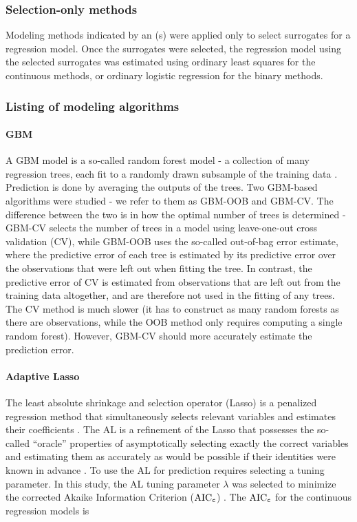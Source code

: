 \documentclass[authoryear,review, 12pt]{elsarticle}
\begin{document}
\subsubsection{Selection-only methods}\label{selection-only-methods}

Modeling methods indicated by an (s) were applied only to select
surrogates for a regression model. Once the surrogates were selected,
the regression model using the selected surrogates was estimated using
ordinary least squares for the continuous methods, or ordinary logistic
regression for the binary methods.

\subsubsection{Listing of modeling
algorithms}\label{listing-of-modeling-algorithms}

\paragraph{GBM}\label{gbm}

A GBM model is a so-called random forest model - a collection of many
regression trees, each fit to a randomly drawn subsample of the training
data \citep{Friedman-2001}. Prediction is done by averaging the outputs
of the trees. Two GBM-based algorithms were studied - we refer to them
as GBM-OOB and GBM-CV. The difference between the two is in
how the optimal number of trees is determined - GBM-CV selects the
number of trees in a model using leave-one-out cross validation (CV),
while GBM-OOB uses the so-called out-of-bag error estimate, where the
predictive error of each tree is estimated by its predictive error over
the observations that were left out when fitting the tree. In contrast,
the predictive error of CV is estimated from observations that are left
out from the training data altogether, and are therefore not used in the
fitting of any trees. The CV method is much slower (it has to construct
as many random forests as there are observations, while the OOB method
only requires computing a single random forest). However, GBM-CV should
more accurately estimate the prediction error.

\paragraph{Adaptive Lasso}\label{adaptive-lasso}

The least absolute shrinkage and selection operator (Lasso) is a
penalized regression method that simultaneously selects relevant
variables and estimates their coefficients \citep{Tibshirani-1996}. The
AL is a refinement of the Lasso that possesses the so-called ``oracle''
properties of asymptotically selecting exactly the correct variables
and estimating them as accurately as would be possible if their
identities were known in advance \citep{Zou-2006}. To use the AL for
prediction requires selecting a tuning parameter. In this study, the AL
tuning parameter \(\lambda\) was selected to minimize the corrected
Akaike Information Criterion (\(\text{AIC}_{\tt c}\)) \citep{Akaike-1973,Hurvich-Simonoff-Tsai-1998}. The \(\text{AIC}_{\tt c}\) for the
continuous regression models is
\end{document}
